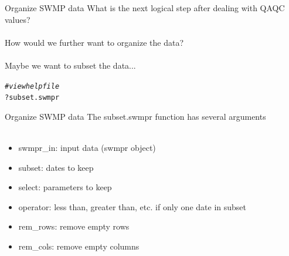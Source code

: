 \documentclass[xcolor=svgnames]{beamer}\usepackage[]{graphicx}\usepackage[]{color}
\makeatletter
\newcommand{\hlcom}[1]{\textcolor[rgb]{0.678,0.584,0.686}{\textit{#1}}}%
\newcommand{\hlopt}[1]{\textcolor[rgb]{0,0,0}{#1}}%
\newcommand{\hlstd}[1]{\textcolor[rgb]{0.345,0.345,0.345}{#1}}%
\newenvironment{kframe}{%
 \def\at@end@of@kframe{}%
 \ifinner\ifhmode%
  \def\at@end@of@kframe{\end{minipage}}%
  \begin{minipage}{\columnwidth}%
 \fi\fi%
 \def\FrameCommand##1{\hskip\@totalleftmargin \hskip-\fboxsep
 \colorbox{shadecolor}{##1}\hskip-\fboxsep
     \hskip-\linewidth \hskip-\@totalleftmargin \hskip\columnwidth}%
 \MakeFramed {\advance\hsize-\width
   \@totalleftmargin\z@ \linewidth\hsize
   \@setminipage}}%
 {\par\unskip\endMakeFramed%
 \at@end@of@kframe}
\newenvironment{knitrout}{}{} %
\makeatother
\begin{document}
\begin{frame}[containsverbatim]{Organize SWMP data}
What is the next logical step after dealing with QAQC values? \\~\\
How would we further want to organize the data? \\~\\
Maybe we want to subset the data...
\begin{knitrout}\scriptsize
{}\color{fgcolor}\begin{kframe}
\begin{alltt}
\hlcom{# view help file}
\hlopt{?}\hlstd{subset.swmpr}
\end{alltt}
\end{kframe}
\end{knitrout}
\end{frame}

\begin{frame}[containsverbatim]{Organize SWMP data}
The subset.swmpr function has several arguments \\~\\
\begin{itemize}
\item swmpr\_in: input data (swmpr object)
\item subset: dates to keep
\item select: parameters to keep
\item operator: less than, greater than, etc. if only one date in subset
\item rem\_rows: remove empty rows
\item rem\_cols: remove empty columns \\~\\
\end{itemize}
\end{frame}
\end{document}
